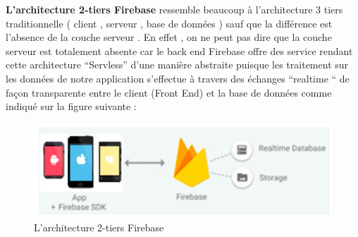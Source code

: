 \documentclass[11pt,a4paper,oneside]{book}
\begin{document}
			\textbf{L’architecture 2-tiers Firebase}  ressemble beaucoup à l’architecture 3 tiers traditionnelle  ( client , serveur , base de données ) sauf que la différence est l’absence de la couche serveur . En effet , on ne peut pas dire que la couche serveur est totalement absente car le back end Firebase offre des service rendant cette architecture “Servless” d’une manière abstraite puisque les traitement sur les données de notre application s’effectue à travers des échanges “realtime “ de façon transparente entre le client (Front End) et la base de données comme indiqué sur la figure suivante :  
			\begin{figure}[H]
				\centering
				\includegraphics[width=1\textwidth]{"Images/ch4/Architecture 2-tiers Firebase"}
				\caption{L’architecture 2-tiers Firebase}
				\label{fig:architecture-2-tiers-firebase}
			\end{figure}
\end{document}
